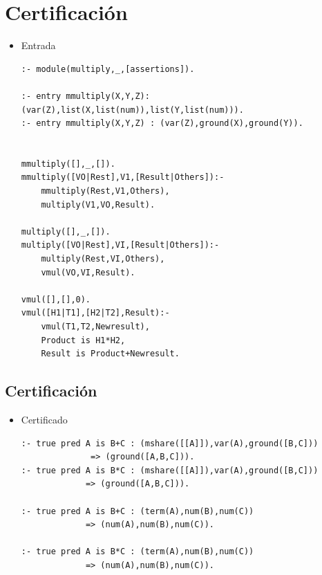 \documentclass[11pt]{article}
\begin{document}
\section*{Certificación}
\label{sec:org0a91cfd}
\begin{itemize}
\item Entrada
\begin{verbatim}
:- module(multiply,_,[assertions]).

:- entry mmultiply(X,Y,Z): (var(Z),list(X,list(num)),list(Y,list(num))).
:- entry mmultiply(X,Y,Z) : (var(Z),ground(X),ground(Y)). 


mmultiply([],_,[]).
mmultiply([VO|Rest],V1,[Result|Others]):-
    mmultiply(Rest,V1,Others),
    multiply(V1,VO,Result).

multiply([],_,[]).
multiply([VO|Rest],VI,[Result|Others]):-
    multiply(Rest,VI,Others),
    vmul(VO,VI,Result).

vmul([],[],0).
vmul([H1|T1],[H2|T2],Result):-
    vmul(T1,T2,Newresult),
    Product is H1*H2,
    Result is Product+Newresult.
\end{verbatim}
\end{itemize}

\subsection*{Certificación}
\label{sec:org0c9be03}
\begin{itemize}
\item Certificado
\begin{verbatim}
:- true pred A is B+C : (mshare([[A]]),var(A),ground([B,C]))
			  => (ground([A,B,C])).
:- true pred A is B*C : (mshare([[A]]),var(A),ground([B,C]))
			 => (ground([A,B,C])).

:- true pred A is B+C : (term(A),num(B),num(C))
			 => (num(A),num(B),num(C)).

:- true pred A is B*C : (term(A),num(B),num(C))
			 => (num(A),num(B),num(C)).
\end{verbatim}
\end{itemize}
\end{document}
